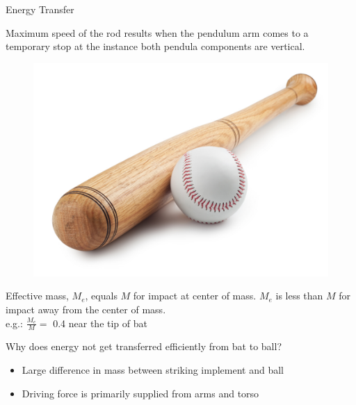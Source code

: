 \documentclass[tikz]{beamer}
\begin{document}
\begin{frame} {Energy Transfer}
	\only<1> {
		Maximum speed of the rod results when the pendulum arm comes to a temporary stop at the instance both pendula components are vertical.\\
		\begin{figure}
			\centering
			\includegraphics[scale=0.4]{baseballbat.jpg}
		\end{figure}
		Effective mass, $M_e$, equals $M$ for impact at center of mass. $M_e$ is less than $M$ for impact away from the center of mass.\\
		e.g.:	$\frac{M_e}{M} =$ 0.4 near the tip of bat\\

	}
	 {
		Why does energy not get transferred efficiently from bat to ball?\\
		\begin{itemize}
			\item Large difference in mass between striking implement and ball
			\item Driving force is primarily supplied from arms and torso
		\end{itemize}

}
\end{frame}
\end{document}
